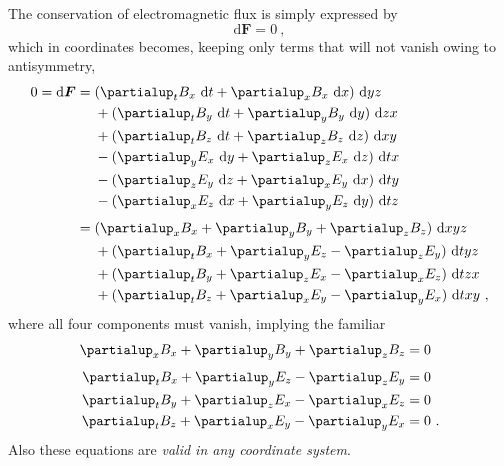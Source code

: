 \documentclass[\ifafour a4paper,12pt,\else a5paper,10pt,\fi%
onecolumn,oneside,article,%
british%
]{memoir}
\theoremstyle{remark}
\theoremstyle{innote}
\newcommand*{\de}{\partialup}%
\newcommand*{\di}{\mathrm{d}}%
\renewcommand*{\|}[1][]{\nonscript\:#1\vert\nonscript\:\mathopen{}}
\begin{document}
The conservation of electromagnetic flux is simply expressed by
\begin{equation}
  \label{eq:cons_EM}
  \di \bm{F} = 0 \ ,
\end{equation}
which in coordinates becomes, keeping only terms that will not vanish owing to antisymmetry,
\begin{equation}
  \label{eq:cons_EM_coords}
  \begin{split}
    0 = \di\bm{F} &=
    \!\begin{aligned}[t]
     & (\de_{t}B_{x}\ \di t + \de_{x}B_{x}\ \di x)\ \di yz\\
    &{}+ (\de_{t}B_{y}\ \di t + \de_{y}B_{y}\ \di y)\ \di zx\\
    &{}+  (\de_{t}B_{z}\ \di t + \de_{z}B_{z}\ \di z)\ \di xy\\
    &{}- (\de_{y}E_{x}\ \di y + \de_{z}E_{x}\ \di z)\ \di tx\\
    &{}- (\de_{z}E_{y}\ \di z + \de_{x}E_{y}\ \di x)\ \di ty\\
    &{}- (\de_{x}E_{z}\ \di x + \de_{y}E_{z}\ \di y)\ \di tz
    \end{aligned}
  \\[\jot]
  &=
  \!\begin{aligned}[t]
&(\de_{x}B_{x} + \de_{y}B_{y} + \de_{z}B_{z})\ \di xyz \\
  &{}+ (\de_{t}B_{x} + \de_{y}E_{z} - \de_{z}E_{y})\ \di tyz \\
  &{}+ (\de_{t}B_{y} + \de_{z}E_{x} - \de_{x}E_{z})\ \di tzx \\
  &{}+ (\de_{t}B_{z} + \de_{x}E_{y} - \de_{y}E_{x})\ \di txy \ ,
\end{aligned}
  \end{split}
\end{equation}
where all four components must vanish, implying the familiar
\begin{equation}
  \label{eq:cons_EM_familiar}
  \begin{aligned}
    \de_{x}B_{x} + \de_{y}B_{y} + \de_{z}B_{z} &= 0 \\[\jot]
  \de_{t}B_{x} + \de_{y}E_{z} - \de_{z}E_{y} &=0 \\
  \de_{t}B_{y} + \de_{z}E_{x} - \de_{x}E_{z} &=0 \\
  \de_{t}B_{z} + \de_{x}E_{y} - \de_{y}E_{x} &=0 \ .
\end{aligned}
\end{equation}
Also these equations are \emph{valid in any coordinate system}.
\end{document}
